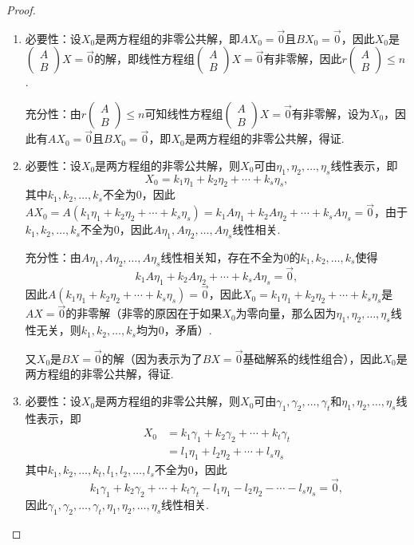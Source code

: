\begin{proof}
    \begin{enumerate}
        \item 必要性：设$X_0$是两方程组的非零公共解，即$AX_0=\vec{0}$且$BX_0=\vec{0}$，因此$X_0$是$\begin{pmatrix}
                      A \\ B
                  \end{pmatrix}X=\vec{0}$的解，即线性方程组$\begin{pmatrix}
                    A \\ B
                \end{pmatrix}X=\vec{0}$有非零解，因此$r\begin{pmatrix}
                      A \\ B
                  \end{pmatrix}\leqslant n$.

        充分性：由$r\begin{pmatrix}
            A \\ B
        \end{pmatrix}\leqslant n$可知线性方程组$\begin{pmatrix}
            A \\ B
        \end{pmatrix}X=\vec{0}$有非零解，设为$X_0$，因此有$AX_0=\vec{0}$且$BX_0=\vec{0}$，即$X_0$是两方程组的非零公共解，得证.

        \item 必要性：设$X_0$是两方程组的非零公共解，则$X_0$可由$\eta_1,\eta_2,\ldots,\eta_s$线性表示，即
        \[X_0=k_1\eta_1+k_2\eta_2+\cdots+k_s\eta_s,\]
        其中$k_1,k_2,\ldots,k_s$不全为0，因此$AX_0=A(k_1\eta_1+k_2\eta_2+\cdots+k_s\eta_s)=k_1A\eta_1+k_2A\eta_2+\cdots+k_sA\eta_s=\vec{0}$，由于$k_1,k_2,\ldots,k_s$不全为0，因此$A\eta_1,A\eta_2,\ldots,A\eta_s$线性相关.

        充分性：由$A\eta_1,A\eta_2,\ldots,A\eta_s$线性相关知，存在不全为0的$k_1,k_2,\ldots,k_s$使得
        \[k_1A\eta_1+k_2A\eta_2+\cdots+k_sA\eta_s=\vec{0},\]
        因此$A(k_1\eta_1+k_2\eta_2+\cdots+k_s\eta_s)=\vec{0}$，因此$X_0=k_1\eta_1+k_2\eta_2+\cdots+k_s\eta_s$是$AX=\vec{0}$的非零解（非零的原因在于如果$X_0$为零向量，那么因为$\eta_1,\eta_2,\ldots,\eta_s$线性无关，则$k_1,k_2,\ldots,k_s$均为0，矛盾）.

        又$X_0$是$BX=\vec{0}$的解（因为表示为了$BX=\vec{0}$基础解系的线性组合），因此$X_0$是两方程组的非零公共解，得证.

        \item 必要性：设$X_0$是两方程组的非零公共解，则$X_0$可由$\gamma_1,\gamma_2,\ldots,\gamma_t$和$\eta_1,\eta_2,\ldots,\eta_s$线性表示，即
        \begin{align*}
            X_0&=k_1\gamma_1+k_2\gamma_2+\cdots+k_t\gamma_t \\
            &=l_1\eta_1+l_2\eta_2+\cdots+l_s\eta_s
        \end{align*}
        其中$k_1,k_2,\ldots,k_t,l_1,l_2,\ldots,l_s$不全为0，因此
        \[k_1\gamma_1+k_2\gamma_2+\cdots+k_t\gamma_t-l_1\eta_1-l_2\eta_2-\cdots-l_s\eta_s=\vec{0},\]
        因此$\gamma_1,\gamma_2,\ldots,\gamma_t,\eta_1,\eta_2,\ldots,\eta_s$线性相关.


\end{enumerate}
\end{proof}
